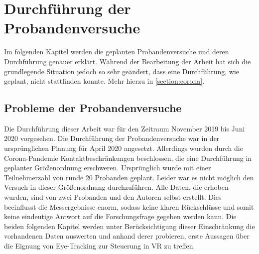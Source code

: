 
\chapter{Durchführung  der Probandenversuche} 

Im folgenden Kapitel werden die geplanten Probandenversuche und deren Durchführung genauer erklärt. Während der Bearbeitung der Arbeit hat sich die grundlegende Situation jedoch so sehr geändert, dass eine Durchführung, wie geplant, nicht stattfinden konnte. Mehr hierzu in \autoref{section:corona}.

\section{Probleme der Probandenversuche}
\label{section:corona}
Die Durchführung dieser Arbeit war für den Zeitraum November 2019 bis Juni 2020 vorgesehen. Die Durchführung der Probandenversuche war in der ursprünglichen Planung für April 2020 angesetzt. Allerdings wurden durch die Corona-Pandemie  Kontaktbeschränkungen beschlossen, die eine Durchführung in geplanter Größenordnung erschweren. Ursprünglich wurde mit einer Teilnehmerzahl von runde 20 Probanden geplant. Leider war es nicht möglich den Versuch in dieser Größenordnung durchzuführen. Alle Daten, die erhoben wurden, sind von zwei Probanden und den Autoren selbst erstellt. Dies beeinflusst die Messergebnisse enorm, sodass keine klaren Rückschlüsse und somit keine eindeutige Antwort auf die Forschungsfrage gegeben werden kann. Die beiden folgenden Kapitel werden unter Berücksichtigung dieser Einschränkung die vorhandenen Daten auswerten und anhand derer probieren, erste Aussagen über die Eignung von Eye-Tracking zur Steuerung in VR zu treffen.

